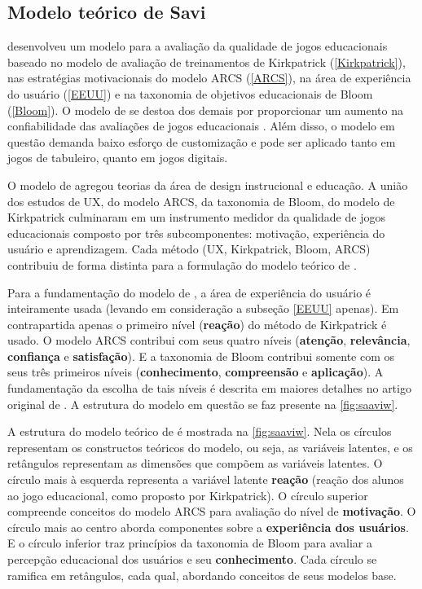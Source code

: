 \subsection{Modelo teórico de Savi}
\label{savizinho}

 desenvolveu um modelo para a avaliação da qualidade de jogos educacionais baseado no modelo de avaliação de treinamentos de Kirkpatrick (\autoref{Kirkpatrick}), nas estratégias motivacionais do modelo ARCS (\autoref{ARCS}), na área de experiência do usuário (\autoref{EEUU}) e na taxonomia de objetivos educacionais de Bloom (\autoref{Bloom}). O modelo de  se destoa dos demais por proporcionar um aumento na confiabilidade das avaliações de jogos educacionais \cite{savi2010proposta}. Além disso, o modelo em questão demanda baixo esforço de customização e pode ser aplicado tanto em jogos de tabuleiro, quanto em jogos digitais. 

O modelo de  agregou teorias da área de design instrucional e educação. A união dos estudos de \ac{UX}, do modelo \ac{ARCS}, da taxonomia de Bloom, do modelo de Kirkpatrick culminaram em um instrumento medidor da qualidade de jogos educacionais composto por três subcomponentes: motivação, experiência do usuário e aprendizagem. Cada método (\ac{UX}, Kirkpatrick, Bloom, \ac{ARCS}) contribuiu de forma distinta para a formulação do modelo teórico de .

Para a fundamentação do modelo de , a área de experiência do usuário é inteiramente usada (levando em consideração a subseção \ref{EEUU} apenas). Em contrapartida apenas o primeiro nível (\textbf{reação}) do método de Kirkpatrick é usado. O modelo \ac{ARCS} contribui com seus quatro níveis (\textbf{atenção}, \textbf{relevância}, \textbf{confiança} e \textbf{satisfação}). E a taxonomia de Bloom contribui somente com os seus três primeiros níveis (\textbf{conhecimento}, \textbf{compreensão} e \textbf{aplicação}). A fundamentação da escolha de tais níveis é descrita em maiores detalhes no artigo original de . A estrutura do modelo em questão se faz presente na \autoref{fig:saaviw}.





A estrutura do modelo teórico de  é mostrada na  \autoref{fig:saaviw}. Nela os círculos representam os constructos teóricos do modelo, ou seja, as variáveis latentes, e os retângulos representam as dimensões que compõem as variáveis latentes. O círculo mais à esquerda representa a variável latente \textbf{reação} (reação dos alunos ao jogo educacional, como proposto por Kirkpatrick). O círculo superior compreende conceitos do modelo ARCS para avaliação do nível de \textbf{motivação}. O círculo mais ao centro aborda componentes sobre a \textbf{experiência dos usuários}. E o círculo inferior traz princípios da taxonomia de Bloom para avaliar a percepção educacional dos usuários e seu \textbf{conhecimento}. Cada círculo se ramifica em retângulos, cada qual, abordando conceitos de seus modelos base. 

